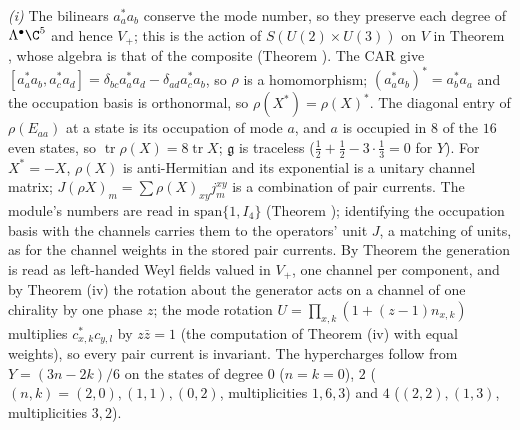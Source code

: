 \emph{(i)} The bilinears $a^{*}_{a}a_{b}$ conserve the mode number, so they preserve each degree of $\Lambda^{\bullet}\C^{5}$ and hence $V_{+}$; this is the action of $S(U(2) \times U(3))$ on $V$ in Theorem , whose algebra is that of the composite (Theorem ). The CAR give $[a^{*}_{a}a_{b}, a^{*}_{c}a_{d}] = \delta_{bc}a^{*}_{a}a_{d} - \delta_{ad}a^{*}_{c}a_{b}$, so $\rho$ is a homomorphism; $(a^{*}_{a}a_{b})^{*} = a^{*}_{b}a_{a}$ and the occupation basis is orthonormal, so $\rho(X^{*}) = \rho(X)^{*}$. The diagonal entry of $\rho(E_{aa})$ at a state is its occupation of mode $a$, and $a$ is occupied in $8$ of the $16$ even states, so $\operatorname{tr}\rho(X) = 8\operatorname{tr}X$; $\mathfrak{g}$ is traceless ($\tfrac12 + \tfrac12 - 3\cdot\tfrac13 = 0$ for $Y$). For $X^{*} = -X$, $\rho(X)$ is anti-Hermitian and its exponential is a unitary channel matrix; $J(\rho X)_{m} = \sum\rho(X)_{xy}j^{xy}_{m}$ is a combination of pair currents. The module's numbers are read in $\mathrm{span}\{1, I_{4}\}$ (Theorem ); identifying the occupation basis with the channels carries them to the operators' unit $J$, a matching of units, as for the channel weights in the stored pair currents. By Theorem  the generation is read as left-handed Weyl fields valued in $V_{+}$, one channel per component, and by Theorem (iv) the rotation about the generator acts on a channel of one chirality by one phase $z$; the mode rotation $U = \prod_{x,k}(1 + (z - 1)n_{x,k})$ multiplies $c^{*}_{x,k}c_{y,l}$ by $z\bar z = 1$ (the computation of Theorem (iv) with equal weights), so every pair current is invariant. The hypercharges follow from $Y = (3n - 2k)/6$ on the states of degree $0$ ($n = k = 0$), $2$ ($(n, k) = (2, 0), (1, 1), (0, 2)$, multiplicities $1, 6, 3$) and $4$ ($(2, 2), (1, 3)$, multiplicities $3, 2$).

